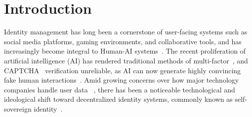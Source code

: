 \vspace{-2mm}
\section{Introduction} 
\vspace{-2mm}
\label{sec:introduction}
Identity management has long been a cornerstone of user-facing systems such as social media platforms, gaming environments, and collaborative tools, and has increasingly become integral to Human-AI systems~\cite{gorwa2020unpacking, cetinkaya2007verification}. The recent proliferation of artificial intelligence (AI) has rendered traditional methods of multi-factor~\cite{aloul2009two}, and CAPTCHA~\cite{von-Ahn2003-wr} verification unreliable, as AI can now generate highly convincing fake human interactions~\cite{carlini2024poisoning, akhtar2024sok, goodrich2023battling}. 
Amid growing concerns over how major technology companies handle user data
~\cite{nytimesCambridgeAnalytica}, there has been a noticeable technological and ideological shift toward decentralized identity systems, commonly known as self-sovereign identity~\cite{mahula2021blockchain}. 

